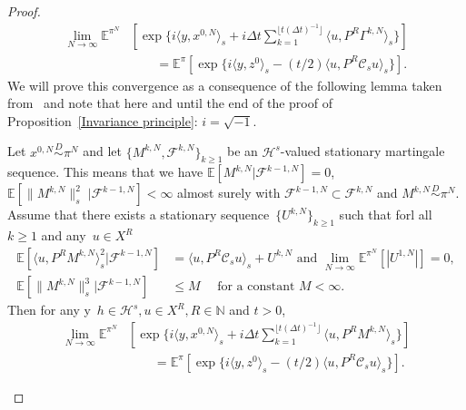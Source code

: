 \begin{proof}
  \begin{equation}
    \begin{split}
      \lim_{N \to \infty} \mathbb{E}^{\pi^N} & [ \exp \{ i \langle y, x^{0,N} \rangle_s + i \Delta t \sum_{k=1}^{\lfloor t (\Delta t)^{-1}  \rfloor} \langle u , P^R \Gamma^{k,N} \rangle_s \} ] \\
      & \qquad = \mathbb{E}^{\pi} [ \exp \{ i \langle y, z^{0} \rangle_s -   (t/2)  \langle u , P^R \mathcal{C}_s u \rangle_s \} ].
    \end{split}
  \end{equation}
  We will prove this convergence as a consequence of the following lemma taken from~\autocite[Lemma 4.3]{Mattingly2010} and note that here and until the end of the proof of Proposition~\ref{Invariance principle}: $i = \sqrt{-1}$.
  \begin{lemma}\autocite[Lemma 4.3]{Mattingly2010}
    \label{DLR: Lemma Martingale invariance principle Helping Lemma}
    Let $ x^{0,N}\stackrel{D}{\sim} \pi^N$ and let $ \{ M^{k,N}, \mathcal{F}^{k,N}  \}_{k \geq 1} $ be an $ \mathcal{H}^s $-valued stationary martingale sequence. This means that we have
$  \mathbb{E} \left[  M^{k,N} | \mathcal{F}^{k-1,N} \right] =  0 $,  $  \mathbb{E} \left[ \| M^{k,N} \|_{s}^{2} \; | \mathcal{F}^{k-1,N} \right] <  \infty $ almost surely
with $ \mathcal{F}^{k-1,N} \subset \mathcal{F}^{k,N} $ and $M^{k,N} \stackrel{D}{\sim} \pi^N $. Assume that there exists a stationary sequence~$\{ U^{k,N} \}_{k \geq 1}$ such that forl all~$k \geq 1$ and any~$u \in X^R$
\begin{align}
  \label{DLR: Lemma Invariance principle convergence condition 1}
  \mathbb{E}[ \langle u, P^R M^{k,N} \rangle_s^2 | \mathcal{F}^{k-1,N}] & = \langle u, P^R \mathcal{C}_s u \rangle_s + U^{k,N} \text{ and } \lim_{N \to \infty} \mathbb{E}^{\pi^N}[|U^{1,N}|] = 0,\\
  \label{DLR: Lemma Invariance principle convergence condition 2}
   \mathbb{E}[ \| M^{k,N} \|_s^3  |\mathcal{F}^{k-1,N}] & \leq M \quad \text{ for a constant } M < \infty.
\end{align}
Then for any y~$h \in \mathcal{H}^s, u \in X^R, R \in \mathbb{N}$ and $t>0$,
  \begin{equation}
    \label{DLR: Lemma Invariance principle result}
    \begin{split}
      \lim_{N \to \infty} \mathbb{E}^{\pi^N} & [ \exp \{ i \langle y, x^{0,N} \rangle_s + i \Delta t \sum_{k=1}^{\lfloor t (\Delta t)^{-1}  \rfloor} \langle u , P^R M^{k,N} \rangle_s \} ] \\
      & \qquad = \mathbb{E}^{\pi} [ \exp \{ i \langle y, z^{0} \rangle_s -   (t/2)  \langle u , P^R \mathcal{C}_s u \rangle_s \} ].
    \end{split}
  \end{equation}


\end{lemma}
\end{proof}
